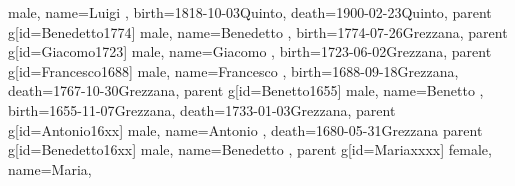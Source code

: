 \documentclass{article}
\begin{document}
\begin{midpage}
\begin{center}
\begin{genealogypicture}
{{{{{{{                            male,
                            name={Luigi },
                            birth={1818-10-03}{Quinto},
                            death={1900-02-23}{Quinto},
                        }
                        parent{
                            g[id=Benedetto1774]{
                                male,
                                name={Benedetto },
                                birth={1774-07-26}{Grezzana},
                            }
                            parent{
                                g[id=Giacomo1723]{
                                    male,
                                    name={Giacomo },
                                    birth={1723-06-02}{Grezzana},
                                }
                                parent{
                                    g[id=Francesco1688]{
                                        male,
                                        name={Francesco },
                                        birth={1688-09-18}{Grezzana},
                                        death={1767-10-30}{Grezzana},
                                    }
                                    parent{
                                        g[id=Benetto1655]{
                                            male,
                                            name={Benetto },
                                            birth={1655-11-07}{Grezzana},
                                            death={1733-01-03}{Grezzana},
                                        }
                                        parent{
                                            g[id=Antonio16xx]{
                                                male,
                                                name={Antonio },
                                                death={1680-05-31}{Grezzana}
                                            }
                                            parent{
                                                g[id=Benedetto16xx]{
                                                    male,
                                                    name={Benedetto },
                                                }
                                            }
                                        }
                                        parent{
                                            g[id=Mariaxxxx]{
                                                female,
                                                name={Maria},
}}}}}}}}}}}}
\end{genealogypicture}
\end{center}
\end{midpage}
\end{document}
